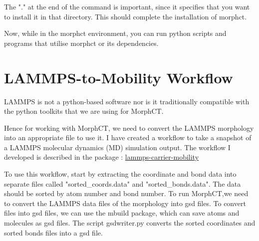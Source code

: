 \documentclass{article}
\begin{document}
The "." at the end of the command is important, since it specifies that you want to install it in that directory. This should complete the installation of morphct.

Now, while in the morphct environment, you can run python scripts and programs that utilise morphct or its dependencies.

\section{LAMMPS-to-Mobility Workflow}

LAMMPS is not a python-based software nor is it traditionally compatible with the python toolkits that we are using for MorphCT.

Hence for working with MorphCT, we need to convert the LAMMPS morphology into an appropriate file to use it. I have created a workflow to take a snapshot of a LAMMPS molecular dynamics (MD) simulation output. The workflow I developed is described in the package : \href{https://github.com/chemicalfiend/lammps-carrier-mobility}{lammps-carrier-mobility}

To use this workflow, start by extracting the coordinate and bond data into separate files called "sorted\_coords.data" and "sorted\_bonds.data". The data should be sorted by atom number and bond number. To run MorphCT,we need to convert the LAMMPS data files of the morphology into gsd files. To convert files into gsd files, we can use the mbuild package, which can save atoms and molecules as gsd files. The script gsdwriter.py converts the sorted coordinates and sorted bonds files into a gsd file. 
\end{document}
